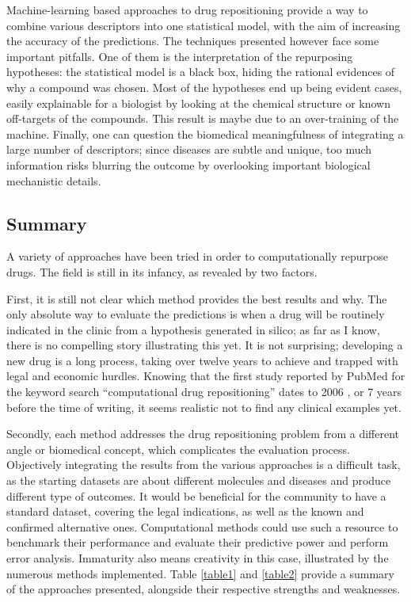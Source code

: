 Machine-learning based approaches to drug repositioning provide a way to combine various descriptors into one statistical model, with the aim of increasing the accuracy of the predictions. The techniques presented however face some important pitfalls. One of them is the interpretation of the repurposing hypotheses: the statistical model is a black box, hiding the rational evidences of why a compound was chosen. Most of the hypotheses end up being evident cases, easily explainable for a biologist by looking at the chemical structure or known off-targets of the compounds. This result is maybe due to an over-training of the machine. Finally, one can question the biomedical meaningfulness of integrating a large number of descriptors; since diseases are subtle and unique, too much information risks blurring the outcome by overlooking important biological mechanistic details.

\subsection{Summary}

A variety of approaches have been tried in order to computationally repurpose drugs. The field is still in its infancy, as revealed by two factors.

First, it is still not clear which method provides the best results and why. The only absolute way to evaluate the predictions is when a drug will be routinely indicated in the clinic from a hypothesis generated in silico; as far as I know, there is no compelling story illustrating this yet. It is not surprising; developing a new drug is a long process, taking over twelve years to achieve and trapped with legal and economic hurdles. Knowing that the first study reported by PubMed for the keyword search ``computational drug repositioning'' dates to 2006 \citep{an2006large}, or 7 years before the time of writing, it seems realistic not to find any clinical examples yet.

Secondly, each method addresses the drug repositioning problem from a different angle or biomedical concept, which complicates the evaluation process. Objectively integrating the results from the various approaches is a difficult task, as the starting datasets are about different molecules and diseases and produce different type of outcomes. It would be beneficial for the community to have a standard dataset, covering the legal indications, as well as the known and confirmed alternative ones. Computational methods could use such a resource to benchmark their performance and evaluate their predictive power and perform error analysis.
Immaturity also means creativity in this case, illustrated by the numerous methods implemented. Table \ref{table1} and \ref{table2} provide a summary of the approaches presented, alongside their respective strengths and weaknesses.

